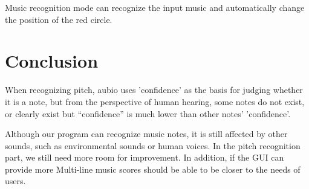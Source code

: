 \documentclass[10pt,twocolumn,letterpaper]{article}
\begin{document}
\begin{CJK}{UTF8}{bsmi}
Music recognition mode can recognize the input music and automatically change the position of the red circle.

\section{Conclusion}

When recognizing pitch, aubio uses 'confidence' as the basis for judging whether it is a note, but from the perspective of human hearing, some notes do not exist, or clearly exist but “confidence” is much lower than other notes' 'confidence'.

Although our program can recognize music notes, it is still affected by other sounds, such as environmental sounds or human voices. In the pitch recognition part, we still need more room for improvement. In addition, if the GUI can provide more Multi-line music scores should be able to be closer to the needs of users.


\end{CJK}
\end{document}

